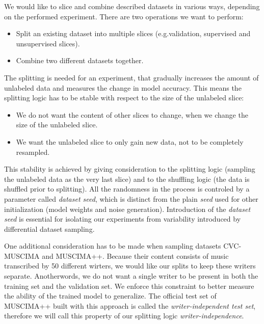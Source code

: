 We would like to slice and combine described datasets in various ways, depending on the performed experiment. There are two operations we want to perform:

\begin{itemize}
    \item Split an existing dataset into multiple slices (e.g.\@ validation, supervised and unsupervised slices).
    \item Combine two different datasets together.
\end{itemize}

The splitting is needed for an experiment, that gradually increases the amount of unlabeled data and measures the change in model accuracy. This means the splitting logic has to be stable with respect to the size of the unlabeled slice:

\begin{itemize}
    \item We do not want the content of other slices to change, when we change the size of the unlabeled slice.
    \item We want the unlabeled slice to only gain new data, not to be completely resampled.
\end{itemize}

This stability is achieved by giving consideration to the splitting logic (sampling the unlabeled data as the very last slice) and to the shuffling logic (the data is shuffled prior to splitting). All the randomness in the process is controled by a parameter called \emph{dataset seed}, which is distinct from the plain \emph{seed} used for other initialization (model weights and noise generation). Introduction of the \emph{dataset seed} is essential for isolating our experiments from variability introduced by differential dataset sampling.

One additional consideration has to be made when sampling datasets CVC-MUSCIMA and MUSCIMA++. Because their content consists of music transcribed by 50 different wirters, we would like our splits to keep these writers separate. Anotherwords, we do not want a single writer to be present in both the training set and the validation set. We enforce this constraint to better measure the ability of the trained model to generalize. The official test set of MUSCIMA++ built with this approach is called the \emph{writer-independent test set}, therefore we will call this property of our splitting logic \emph{writer-independence}.

